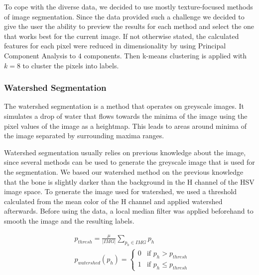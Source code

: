 \documentclass[pdftex,12pt,a4paper]{report}
\begin{document}
To cope with the diverse data, we decided to use mostly texture-focused methods of image segmentation. Since the data provided such a challenge we decided to give the user the ability to preview the results for each method and select the one that works best for the current image. If not otherwise stated, the calculated features for each pixel were reduced in dimensionality by using Principal Component Analysis to $4$ components. Then k-means clustering is applied with $k=8$ to cluster the pixels into labels.

\subsubsection{Watershed Segmentation}
\label{subsub:segmentationwatershed}

The watershed segmentation is a method that operates on greyscale images. It simulates a drop of water that flows towards the minima of the image using the pixel values of the image as a heightmap. This leads to areas around minima of the image separated by surrounding maxima ranges.

Watershed segmentation usually relies on previous knowledge about the image, since several methods can be used to generate the greyscale image that is used for the segmentation. We based our watershed method on the previous knowledge that the bone is slightly darker than the background in the H channel of the HSV image space. To generate the image used for watershed, we used a threshold calculated from the mean color of the H channel and applied watershed afterwards. Before using the data, a local median filter was applied beforehand to smooth the image and the resulting labels.

\begin{equation}
\begin{split}
& p_{thresh} = \frac{\mu}{|IMG|} \sum_{p_h \in IMG} p_h \\
& p_{watershed}(p_h) = \begin{cases} 0 & \text{if } p_h > p_{thresh} \\ 1 & \text{if } p_h \leq p_{thresh} \end{cases}
\end{split}
\end{equation}
\end{document}
